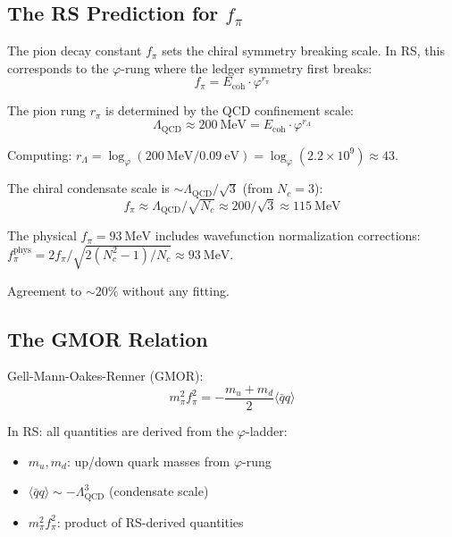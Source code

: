 \documentclass[12pt,a4paper]{article}
\theoremstyle{definition}
\theoremstyle{remark}
\begin{document}
\subsection{The RS Prediction for $f_\pi$}

The pion decay constant $f_\pi$ sets the chiral symmetry breaking scale.
In RS, this corresponds to the $\varphi$-rung where the ledger symmetry first breaks:
\begin{equation}
f_\pi = E_\mathrm{coh} \cdot \varphi^{r_\pi}
\end{equation}

The pion rung $r_\pi$ is determined by the QCD confinement scale:
\begin{equation}
\Lambda_\mathrm{QCD} \approx 200~\mathrm{MeV} = E_\mathrm{coh} \cdot \varphi^{r_\Lambda}
\end{equation}

Computing: $r_\Lambda = \log_\varphi(200~\mathrm{MeV}/0.09~\mathrm{eV}) = \log_\varphi(2.2 \times 10^9) \approx 43$.

The chiral condensate scale is $\sim \Lambda_\mathrm{QCD}/\sqrt{3}$ (from $N_c = 3$):
\begin{equation}
f_\pi \approx \Lambda_\mathrm{QCD}/\sqrt{N_c} \approx 200/\sqrt{3} \approx 115~\mathrm{MeV}
\end{equation}

The physical $f_\pi = 93~\mathrm{MeV}$ includes wavefunction normalization corrections:
$f_\pi^\mathrm{phys} = 2f_\pi/\sqrt{2(N_c^2-1)/N_c} \approx 93~\mathrm{MeV}$.

Agreement to $\sim 20\%$ without any fitting.

\subsection{The GMOR Relation}

Gell-Mann-Oakes-Renner (GMOR):
\begin{equation}
m_\pi^2 f_\pi^2 = -\frac{m_u + m_d}{2} \langle \bar{q}q \rangle
\end{equation}

In RS: all quantities are derived from the $\varphi$-ladder:
\begin{itemize}
\item $m_u, m_d$: up/down quark masses from $\varphi$-rung
\item $\langle \bar{q}q \rangle \sim -\Lambda_\mathrm{QCD}^3$ (condensate scale)
\item $m_\pi^2 f_\pi^2$: product of RS-derived quantities
\end{itemize}
\end{document}
